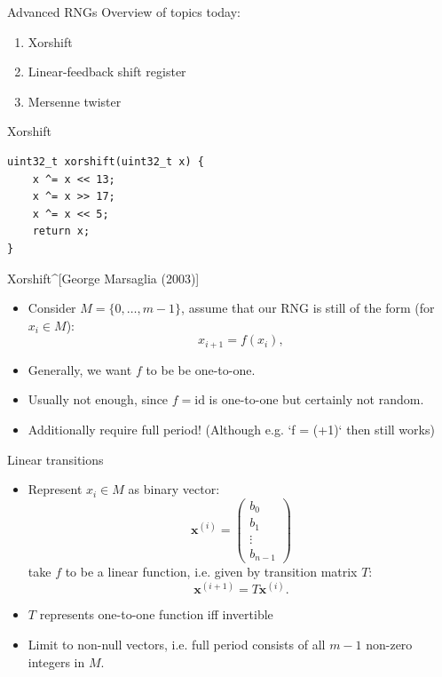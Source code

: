 \documentclass[10pt]{beamer}
\renewcommand{\vec}[1]{\mathbf{#1}}
\begin{document}
\begin{frame}[label={sec:org43878ce}]{Advanced RNGs}
Overview of topics today:

\begin{enumerate}
\item \alert{Xorshift}
\item Linear-feedback shift register
\item Mersenne twister
\end{enumerate}
\end{frame}
\begin{frame}[fragile,label={sec:org3e1bdca}]{Xorshift}
 \begin{verbatim}
uint32_t xorshift(uint32_t x) {
    x ^= x << 13;
    x ^= x >> 17;
    x ^= x << 5;
    return x;
}
\end{verbatim}
\end{frame}
\begin{frame}[label={sec:orgf5d2d72}]{Xorshift\^{}[George Marsaglia (2003)]}
\begin{itemize}
\item Consider \(M = \{ 0, \ldots, m - 1 \}\), assume that our RNG is still of the form (for \(x_i \in M\)):
$$x_{i + 1} = f(x_i),$$
\item Generally, we want \(f\) to be be \alert{one-to-one}.
\item Usually not enough, since \(f = \text{id}\) is one-to-one but certainly not random.
\item Additionally require full period! (Although e.g. `f = (+1)` then still works)
\end{itemize}
\end{frame}
\begin{frame}[label={sec:org3594262}]{Linear transitions}
\begin{itemize}
\item Represent \(x_i \in M\) as binary vector:
$$\vec{x}^{(i)} = \begin{pmatrix}b_{0} \\ b_1 \\ \vdots \\ b_{n - 1} \end{pmatrix}$$
take \(f\) to be a linear function, i.e. given by \alert{transition matrix \(T\)}:
$$\vec{x}^{(i + 1)} = T \vec{x}^{(i)}.$$
\item \(T\) represents one-to-one function iff invertible
\item Limit to non-null vectors, i.e. full period consists of all \(m - 1\) non-zero integers in \(M\).
\end{itemize}
\end{frame}
\end{document}
